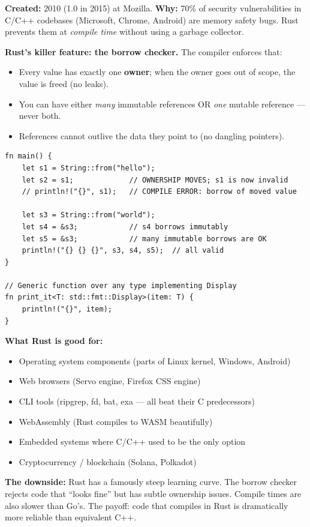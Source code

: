 \documentclass[11pt, letterpaper]{article}
\begin{document}
\textbf{Created:} 2010 (1.0 in 2015) at Mozilla. \textbf{Why:} 70\% of security vulnerabilities in C/C++ codebases (Microsoft, Chrome, Android) are memory safety bugs. Rust prevents them at \emph{compile time} without using a garbage collector.

\textbf{Rust's killer feature: the borrow checker.} The compiler enforces that:
\begin{itemize}[noitemsep]
  \item Every value has exactly one \textbf{owner}; when the owner goes out of scope, the value is freed (no leaks).
  \item You can have either \emph{many} immutable references OR \emph{one} mutable reference --- never both.
  \item References cannot outlive the data they point to (no dangling pointers).
\end{itemize}

\begin{lstlisting}[style=code, caption={Rust: ownership and the borrow checker}]
fn main() {
    let s1 = String::from("hello");
    let s2 = s1;             // OWNERSHIP MOVES; s1 is now invalid
    // println!("{}", s1);   // COMPILE ERROR: borrow of moved value

    let s3 = String::from("world");
    let s4 = &s3;            // s4 borrows immutably
    let s5 = &s3;            // many immutable borrows are OK
    println!("{} {} {}", s3, s4, s5);  // all valid
}

// Generic function over any type implementing Display
fn print_it<T: std::fmt::Display>(item: T) {
    println!("{}", item);
}
\end{lstlisting}

\textbf{What Rust is good for:}
\begin{itemize}[noitemsep]
  \item Operating system components (parts of Linux kernel, Windows, Android)
  \item Web browsers (Servo engine, Firefox CSS engine)
  \item CLI tools (ripgrep, fd, bat, exa --- all beat their C predecessors)
  \item WebAssembly (Rust compiles to WASM beautifully)
  \item Embedded systems where C/C++ used to be the only option
  \item Cryptocurrency / blockchain (Solana, Polkadot)
\end{itemize}

\textbf{The downside:} Rust has a famously steep learning curve. The borrow checker rejects code that ``looks fine'' but has subtle ownership issues. Compile times are also slower than Go's. The payoff: code that compiles in Rust is dramatically more reliable than equivalent C++.
\end{document}
